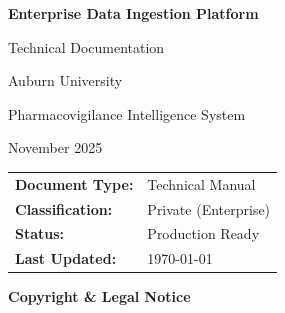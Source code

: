 \documentclass[11pt,a4paper,twoside]{book}
\begin{document}
\begin{titlepage}
    \centering
    \vspace*{2cm}
    
    {\Huge\bfseries Enterprise Data Ingestion Platform\par}
    \vspace{1cm}
    {\Large Technical Documentation\par}
    \vspace{2cm}
    
    
    \vspace{2cm}
    {\large Auburn University\par}
    {\large Pharmacovigilance Intelligence System\par}
    
    \vfill
    
    {\large November 2025\par}
    
    \vspace{1cm}
    
    \begin{tabular}{ll}
        \textbf{Document Type:} & Technical Manual \\
        \textbf{Classification:} & Private (Enterprise) \\
        \textbf{Status:} & Production Ready \\
        \textbf{Last Updated:} & \today
    \end{tabular}
\end{titlepage}

\newpage
\thispagestyle{empty}
\vspace*{\fill}
\begin{center}
    \textbf{Copyright \& Legal Notice}
\end{center}
\end{document}
